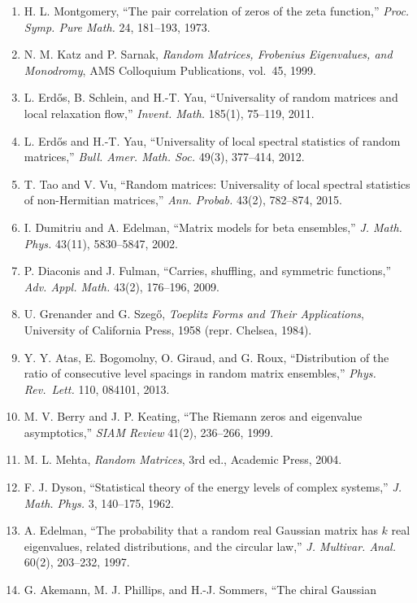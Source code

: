 \documentclass[
  11pt,
]{article}
\providecommand{\tightlist}{%
  \setlength{\itemsep}{0pt}\setlength{\parskip}{0pt}}
\begin{document}
\begin{enumerate}
\def\labelenumi{\arabic{enumi}.}
\tightlist
\item
  H. L. Montgomery, ``The pair correlation of zeros of the zeta function,''
  \emph{Proc. Symp. Pure Math.} 24, 181--193, 1973.
\item
  N. M. Katz and P. Sarnak, \emph{Random Matrices, Frobenius Eigenvalues, and
  Monodromy}, AMS Colloquium Publications, vol.~45, 1999.
\item
  L. Erdős, B. Schlein, and H.-T. Yau, ``Universality of random matrices and
  local relaxation flow,'' \emph{Invent. Math.} 185(1), 75--119, 2011.
\item
  L. Erdős and H.-T. Yau, ``Universality of local spectral statistics of random
  matrices,'' \emph{Bull. Amer. Math. Soc.} 49(3), 377--414, 2012.
\item
  T. Tao and V. Vu, ``Random matrices: Universality of local spectral statistics
  of non-Hermitian matrices,'' \emph{Ann. Probab.} 43(2), 782--874, 2015.
\item
  I. Dumitriu and A. Edelman, ``Matrix models for beta ensembles,'' \emph{J.
  Math. Phys.} 43(11), 5830--5847, 2002.
\item
  P. Diaconis and J. Fulman, ``Carries, shuffling, and symmetric functions,''
  \emph{Adv. Appl. Math.} 43(2), 176--196, 2009.
\item
  U. Grenander and G. Szegő, \emph{Toeplitz Forms and Their Applications},
  University of California Press, 1958 (repr. Chelsea, 1984).
\item
  Y. Y. Atas, E. Bogomolny, O. Giraud, and G. Roux, ``Distribution of the ratio
  of consecutive level spacings in random matrix ensembles,'' \emph{Phys.
  Rev.~Lett.} 110, 084101, 2013.
\item
  M. V. Berry and J. P. Keating, ``The Riemann zeros and eigenvalue
  asymptotics,'' \emph{SIAM Review} 41(2), 236--266, 1999.
\item
  M. L. Mehta, \emph{Random Matrices}, 3rd ed., Academic Press, 2004.
\item
  F. J. Dyson, ``Statistical theory of the energy levels of complex systems,''
  \emph{J. Math. Phys.} 3, 140--175, 1962.
\item
  A. Edelman, ``The probability that a random real Gaussian matrix has \(k\)
  real eigenvalues, related distributions, and the circular law,'' \emph{J.
  Multivar. Anal.} 60(2), 203--232, 1997.
\item
  G. Akemann, M. J. Phillips, and H.-J. Sommers, ``The chiral Gaussian

\end{enumerate}
\end{document}

